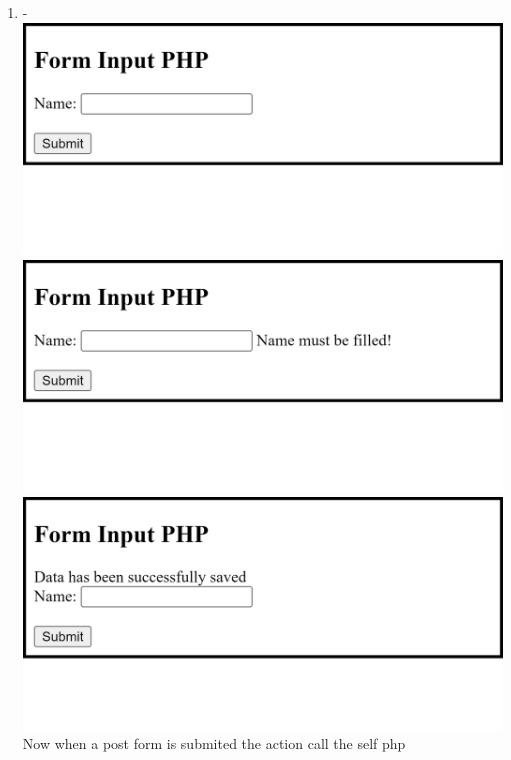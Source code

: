 \documentclass[12pt,titlepage]{article}
\begin{document}
\begin{enumerate}
\begin{enumerate}
        \item - \\ \includegraphics[width=.85\textwidth]{images/figures/fig3.2_a.png} \\ \includegraphics[width=.85\textwidth]{images/figures/fig3.2_b.png} \\ \includegraphics[width=.85\textwidth]{images/figures/fig3.2_c.png} \\ Now when a post form is submited the action call the self php
    \end{enumerate}
    
    \newpage


\end{enumerate}
\end{document}
